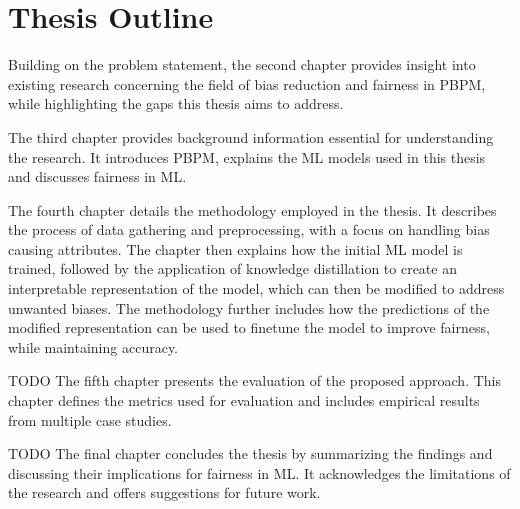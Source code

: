 \section{Thesis Outline}
Building on the problem statement,
the second chapter provides insight into existing research
concerning the field of bias reduction and fairness in PBPM,
while highlighting the gaps this thesis aims to address.

The third chapter provides background information essential for understanding the research.
It introduces PBPM,
explains the ML models used in this thesis
and discusses fairness in ML.

The fourth chapter details the methodology employed in the thesis.
It describes the process of data gathering and preprocessing, with a focus on handling bias causing attributes.
The chapter then explains how the initial ML model is trained,
followed by the application of knowledge distillation to create an interpretable representation of the model,
which can then be modified to address unwanted biases.
The methodology further includes how the predictions of the modified representation 
can be used to finetune the model to improve fairness, while maintaining accuracy.

TODO
The fifth chapter presents the evaluation of the proposed approach.
This chapter defines the metrics used for evaluation and includes empirical results from multiple case studies.

TODO
The final chapter concludes the thesis by summarizing the findings
and discussing their implications for fairness in ML.
It acknowledges the limitations of the research and offers suggestions for future work.